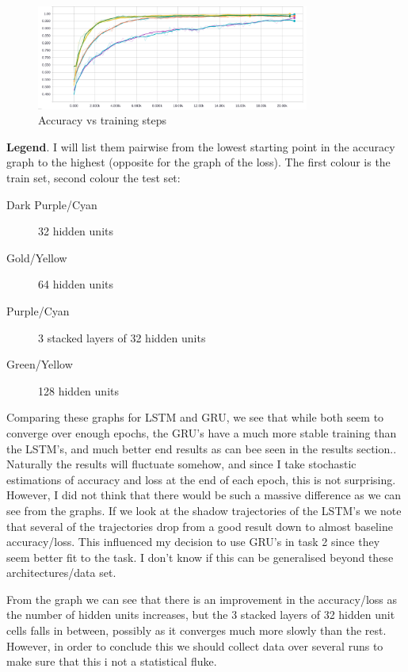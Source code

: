 \documentclass{article}
\begin{document}
\begin{figure}[H]
  \centering
  \includegraphics[width=0.8\textwidth]{task1/GRU_task1_acc.png}
  \caption{Accuracy vs training steps}
  \label{fig:GRU_acc_1}
\end{figure}

\textbf{Legend}. I will list them pairwise from the lowest starting point in the accuracy
graph to the highest (opposite for the graph of the loss). The first colour is the train set, second colour the test set:

\begin{description}
\item[Dark Purple/Cyan] 32 hidden units
\item[Gold/Yellow] 64 hidden units
\item[Purple/Cyan] 3 stacked layers of 32 hidden units
\item[Green/Yellow] 128 hidden units
\end{description}

Comparing these graphs for LSTM and GRU, we see that while both seem to converge
over enough epochs, the 
GRU's have a much more stable training than the LSTM's, and much better end
results as can bee seen in the results section.. Naturally the results
will fluctuate somehow, and since I take stochastic estimations of accuracy and
loss at the end of each epoch, this is not surprising. However, I did not think
that there would be such a massive difference as we can see from the graphs. If
we look at the shadow trajectories of the LSTM's we note that several of the
trajectories drop from a good result down to almost baseline accuracy/loss. This
influenced my decision to use GRU's in task 2 since they seem better fit to the
task. I don't know if this can be generalised beyond these architectures/data
set.

From the graph we can see that there is an improvement in the accuracy/loss as
the number of hidden units increases, but the 3 stacked layers of 32 hidden
unit cells falls in between, possibly as it converges much more slowly than the
rest. However, in order to conclude this we should collect data over several
runs to make sure that this i not a statistical fluke.
\end{document}

